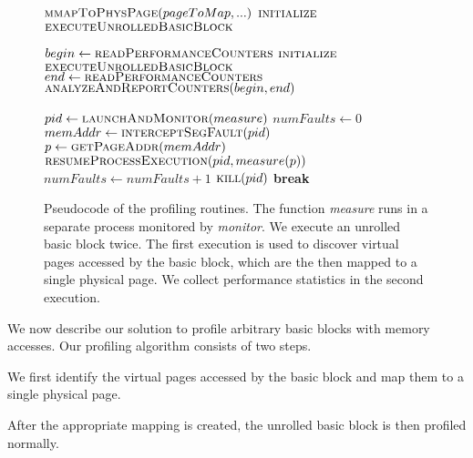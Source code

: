 \begin{figure}
\begin{algorithmic}

    \State $\Call{mmapToPhysPage}{pageToMap, ...}$
    \State $\Call{initialize}{}$
    \State $\Call{executeUnrolledBasicBlock}{}$
    
    
    \State $begin \gets \Call{readPerformanceCounters}{}$
    \State $\Call{initialize}{}$
    \State $\Call{executeUnrolledBasicBlock}{}$
    \State $end \gets \Call{readPerformanceCounters}{}$
    \State $\Call{analyzeAndReportCounters}{begin, end}$
\EndFunction

    \State $pid \gets \Call{launchAndMonitor}{measure}$
    \State $numFaults \gets 0$
        \State $memAddr \gets \Call{interceptSegFault}{pid}$
            \State $p \gets \Call{getPageAddr}{memAddr}$
            \State $\Call{resumeProcessExecution}{pid, measure(p)}$
            \State $numFaults \gets numFaults + 1$
        \EndIf
            \State $\Call{kill}{pid}$
            \State \textbf{break}
        \EndIf
    \EndWhile
\EndFunction

\end{algorithmic}

\caption{Pseudocode of the profiling routines. 
The function \textit{measure} runs in a separate process monitored by
\textit{monitor}.
We execute an unrolled basic block twice.
The first execution is used to discover virtual pages accessed
by the basic block, which are the then mapped to a single physical page.
We collect performance statistics in the second execution.}
\label{fig:code}
\end{figure}

We now describe our solution to profile arbitrary basic blocks with memory accesses.
Our profiling algorithm consists of two steps.
\begin{enumerate*}
\item We first identify the virtual pages accessed by
the basic block 
and map them to a single physical page.
\item After the appropriate mapping is created,
the unrolled basic block is then profiled normally.
\end{enumerate*}

